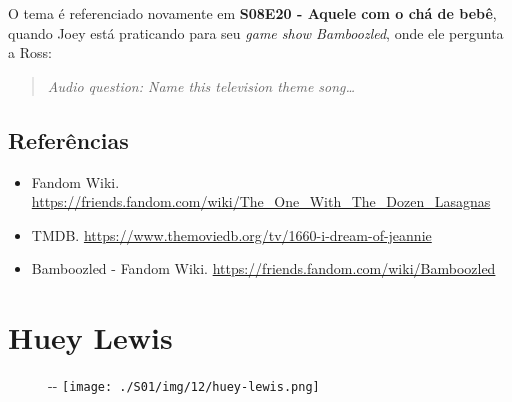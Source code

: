 O tema é referenciado novamente em
\textbf{\textcolor{primarycolor}{S08E20 - Aquele com o chá de bebê}},
quando Joey está praticando para seu \emph{game show Bamboozled}, onde
ele pergunta a Ross:

\begin{quote}
\emph{Audio question: Name this television theme song\ldots{}}
\end{quote}

\hypertarget{referuxeancias-1}{%
\subsection{Referências}\label{referuxeancias-1}}

\begin{itemize}
\tightlist
\item
  \sloppy Fandom Wiki. \url{https://friends.fandom.com/wiki/The_One_With_The_Dozen_Lasagnas}
\item
  \sloppy TMDB. \url{https://www.themoviedb.org/tv/1660-i-dream-of-jeannie}
\item
  \sloppy Bamboozled - Fandom Wiki. \url{https://friends.fandom.com/wiki/Bamboozled}
\end{itemize}

\hypertarget{huey-lewis}{%
\section{Huey Lewis}\label{huey-lewis}}

\begin{figure}[!ht]
  \begin{adjustwidth}{-\oddsidemargin-1in}{-\rightmargin}
    \centering
    \texttt{[image: ./S01/img/12/huey-lewis.png]}
  \end{adjustwidth}
\end{figure}

